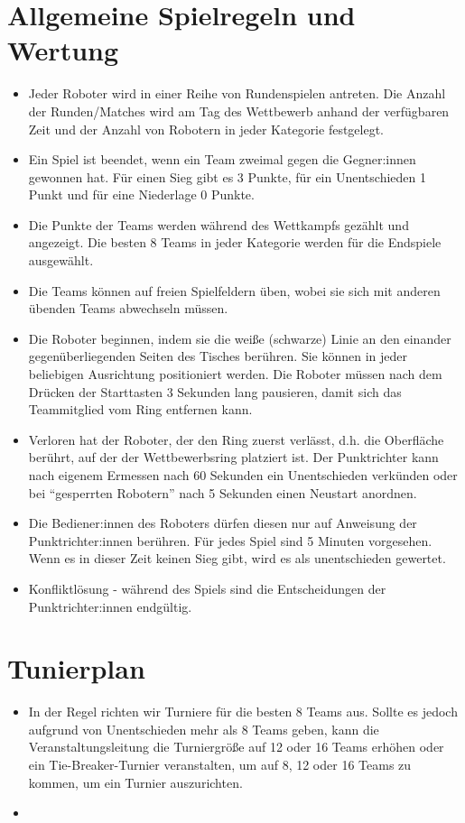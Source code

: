 \documentclass[a4paper,12pt]{article}
\begin{document}
\section{Allgemeine Spielregeln und Wertung}
\begin{itemize}
	\item Jeder Roboter wird in einer Reihe von Rundenspielen antreten. Die
		Anzahl der Runden/Matches wird am Tag des Wettbewerb anhand der
		verfügbaren Zeit und der Anzahl von Robotern in jeder Kategorie
		festgelegt.
	\item Ein Spiel ist beendet, wenn ein Team zweimal gegen die
		Gegner:innen gewonnen hat. Für einen Sieg gibt es 3 Punkte, für
		ein Unentschieden 1 Punkt und für eine Niederlage 0 Punkte.
	\item Die Punkte der Teams werden während des Wettkampfs gezählt und
		angezeigt. Die besten 8 Teams in jeder Kategorie werden für die
		Endspiele ausgewählt.
	\item Die Teams können auf freien Spielfeldern üben, wobei sie sich mit
		anderen übenden Teams abwechseln müssen.
	\item Die Roboter beginnen, indem sie die weiße (schwarze) Linie an den
		einander gegenüberliegenden Seiten des Tisches berühren. Sie
		können in jeder beliebigen Ausrichtung positioniert werden. Die
		Roboter müssen nach dem Drücken der Starttasten 3 Sekunden lang
		pausieren, damit sich das Teammitglied vom Ring entfernen kann.
	\item Verloren hat der Roboter, der den Ring zuerst verlässt, d.h. die
		Oberfläche berührt, auf der der Wettbewerbsring platziert ist.
		Der Punktrichter kann nach eigenem Ermessen nach 60 Sekunden
		ein Unentschieden verkünden oder bei "`gesperrten Robotern"'
		nach 5 Sekunden einen Neustart anordnen.
	\item Die Bediener:innen des Roboters dürfen diesen nur auf Anweisung
		der Punktrichter:innen berühren. Für jedes Spiel sind 5 Minuten
		vorgesehen. Wenn es in dieser Zeit keinen Sieg gibt, wird es
		als unentschieden gewertet.
	\item Konfliktlösung - während des Spiels sind die Entscheidungen der
		Punktrichter:innen endgültig.
\end{itemize}

\pagebreak
\section{Tunierplan}
\begin{itemize}
	\item In der Regel richten wir Turniere für die besten 8 Teams aus.
		Sollte es jedoch aufgrund von Unentschieden mehr als 8 Teams
		geben, kann die Veranstaltungsleitung die Turniergröße auf 12
		oder 16 Teams erhöhen oder ein Tie-Breaker-Turnier
		veranstalten, um auf 8, 12 oder 16 Teams zu kommen, um ein
		Turnier auszurichten.
        \item \tournamentQualification
\end{itemize}
\tournamentScoring
\end{document}
